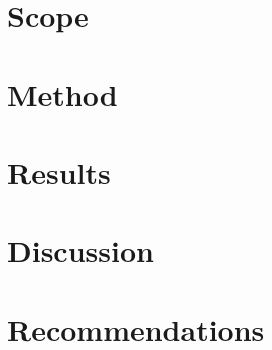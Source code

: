 \documentclass[type=report, lang=en-GB]{plaindoc}   %
\begin{document}
\maketitle

\begin{summary}
\end{summary}

\section{Scope}
\section{Method}
\section{Results}
\section{Discussion}
\section{Recommendations}

\end{document}
